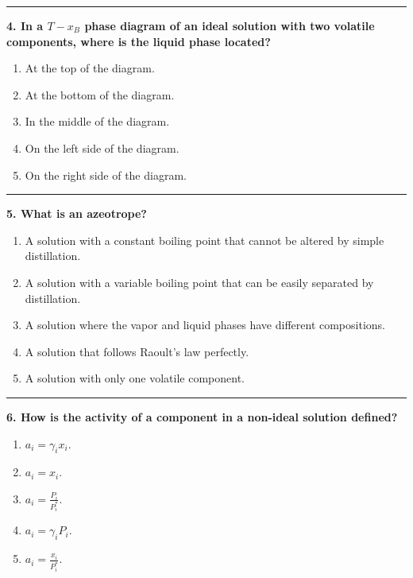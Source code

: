 \documentclass[
  9pt,
]{extbook}
\providecommand{\tightlist}{%
  \setlength{\itemsep}{0pt}\setlength{\parskip}{0pt}}
\theoremstyle{definition}
\theoremstyle{definition}
\theoremstyle{definition}
\theoremstyle{remark}
\begin{document}
\begin{center}\rule{0.5\linewidth}{0.5pt}\end{center}

\textbf{4. In a \(T-x_B\) phase diagram of an ideal solution with two volatile components, where is the liquid phase located?}

\begin{enumerate}
\def\labelenumi{\alph{enumi}.}
\tightlist
\item
  At the top of the diagram.
\item
  At the bottom of the diagram.
\item
  In the middle of the diagram.
\item
  On the left side of the diagram.
\item
  On the right side of the diagram.
\end{enumerate}

\begin{center}\rule{0.5\linewidth}{0.5pt}\end{center}

\textbf{5. What is an azeotrope?}

\begin{enumerate}
\def\labelenumi{\alph{enumi}.}
\tightlist
\item
  A solution with a constant boiling point that cannot be altered by simple distillation.
\item
  A solution with a variable boiling point that can be easily separated by distillation.
\item
  A solution where the vapor and liquid phases have different compositions.
\item
  A solution that follows Raoult's law perfectly.
\item
  A solution with only one volatile component.
\end{enumerate}

\begin{center}\rule{0.5\linewidth}{0.5pt}\end{center}

\textbf{6. How is the activity of a component in a non-ideal solution defined?}

\begin{enumerate}
\def\labelenumi{\alph{enumi}.}
\tightlist
\item
  \(a_i = \gamma_i x_i\).
\item
  \(a_i = x_i\).
\item
  \(a_i = \frac{P_i}{P^*_i}\).
\item
  \(a_i = \gamma_i P_i\).
\item
  \(a_i = \frac{x_i}{P^*_i}\).
\end{enumerate}
\end{document}

